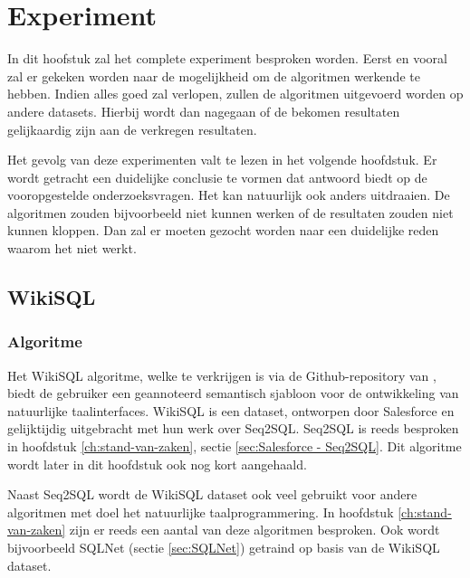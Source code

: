 
\chapter{Experiment}
\label{ch:experiment}

In dit hoofstuk zal het complete experiment besproken worden. Eerst en vooral zal er gekeken worden naar de mogelijkheid om de algoritmen werkende te hebben. Indien alles goed zal verlopen, zullen de algoritmen uitgevoerd worden op andere datasets. Hierbij wordt dan nagegaan of de bekomen resultaten gelijkaardig zijn aan de verkregen resultaten. 

Het gevolg van deze experimenten valt te lezen in het volgende hoofdstuk. Er wordt getracht een duidelijke conclusie te vormen dat antwoord biedt op de vooropgestelde onderzoeksvragen. Het kan natuurlijk ook anders uitdraaien. De algoritmen zouden bijvoorbeeld niet kunnen werken of de resultaten zouden niet kunnen kloppen. Dan zal er moeten gezocht worden naar een duidelijke reden waarom het niet werkt.

\section{WikiSQL}

\subsection{Algoritme}

Het WikiSQL algoritme, welke te verkrijgen is via de Github-repository van \textcite{wikisql}, biedt de gebruiker een geannoteerd semantisch sjabloon voor de ontwikkeling van natuurlijke taalinterfaces. WikiSQL is een dataset, ontworpen door Salesforce en gelijktijdig uitgebracht met hun werk over Seq2SQL. Seq2SQL is reeds besproken in hoofdstuk \ref{ch:stand-van-zaken}, sectie \ref{sec:Salesforce - Seq2SQL}. Dit algoritme wordt later in dit hoofdstuk ook nog kort aangehaald.

Naast Seq2SQL wordt de WikiSQL dataset ook veel gebruikt voor andere algoritmen met doel het natuurlijke taalprogrammering. In hoofdstuk \ref{ch:stand-van-zaken} zijn er reeds een aantal van deze algoritmen besproken. Ook wordt bijvoorbeeld SQLNet (sectie \ref{sec:SQLNet}) getraind op basis van de WikiSQL dataset.


